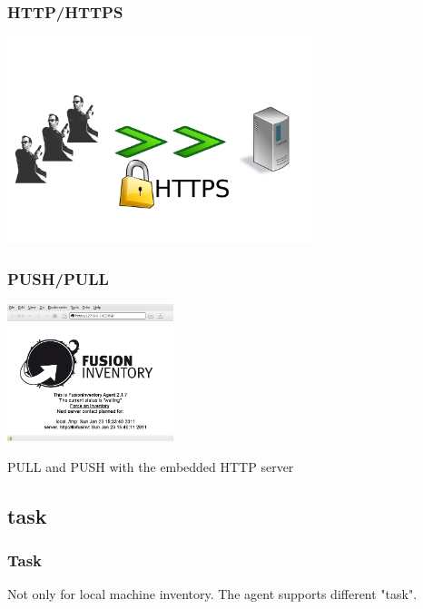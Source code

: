 \begin{frame}
\frametitle{HTTP/HTTPS}
%
\includegraphics[height=6.0cm]{pics/https.pdf}
%
\end{frame}
\begin{frame}
\frametitle{PUSH/PULL}
\includegraphics[height=4.0cm]{pics/http-server.png}

PULL and PUSH with the embedded HTTP server
%
\end{frame}

\subsection{task}
\begin{frame}
\frametitle{Task}
%
Not only for local machine inventory. The agent supports different "task".
\end{frame}



